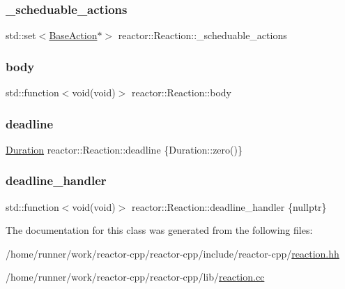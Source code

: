 \subsubsection{\texorpdfstring{\+\_\+scheduable\+\_\+actions}{\_scheduable\_actions}}
{\footnotesize\ttfamily std\+::set$<$\hyperlink{classreactor_1_1BaseAction}{Base\+Action}$\ast$$>$ reactor\+::\+Reaction\+::\+\_\+scheduable\+\_\+actions\hspace{0.3cm}{\ttfamily [private]}}

\mbox{\label{classreactor_1_1Reaction_aca4e15066e159bf9c009c87f5ec11180}} 
\subsubsection{\texorpdfstring{body}{body}}
{\footnotesize\ttfamily std\+::function$<$void(void)$>$ reactor\+::\+Reaction\+::body\hspace{0.3cm}{\ttfamily [private]}}

\mbox{\label{classreactor_1_1Reaction_aa8704882695ff4a0b9ab7d866b2f79b1}} 
\subsubsection{\texorpdfstring{deadline}{deadline}}
{\footnotesize\ttfamily \hyperlink{namespacereactor_aa8375b807a80703545664096c5b5b779}{Duration} reactor\+::\+Reaction\+::deadline \{Duration\+::zero()\}\hspace{0.3cm}{\ttfamily [private]}}

\mbox{\label{classreactor_1_1Reaction_aaa6466268aa7e9ba823a7a45b7c75667}} 
\subsubsection{\texorpdfstring{deadline\+\_\+handler}{deadline\_handler}}
{\footnotesize\ttfamily std\+::function$<$void(void)$>$ reactor\+::\+Reaction\+::deadline\+\_\+handler \{nullptr\}\hspace{0.3cm}{\ttfamily [private]}}



The documentation for this class was generated from the following files\+:\begin{DoxyCompactItemize}
\item 
/home/runner/work/reactor-\/cpp/reactor-\/cpp/include/reactor-\/cpp/\hyperlink{reaction_8hh}{reaction.\+hh}\item 
/home/runner/work/reactor-\/cpp/reactor-\/cpp/lib/\hyperlink{reaction_8cc}{reaction.\+cc}\end{DoxyCompactItemize}
